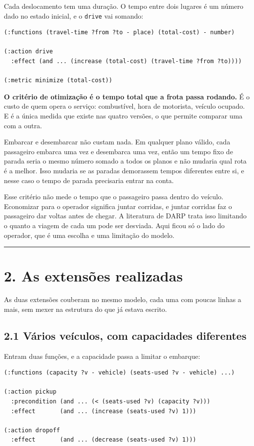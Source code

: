 \documentclass[11pt,a4paper]{article}
\newcommand{\cod}[1]{\texttt{#1}}
\newcommand{\separador}{\begin{center}\rule{0.45\linewidth}{0.4pt}\end{center}}
\begin{document}
Cada deslocamento tem uma duração. O tempo entre dois lugares é um número dado no estado inicial, e o \cod{drive} vai somando:

\begin{lstlisting}
(:functions (travel-time ?from ?to - place) (total-cost) - number)

(:action drive
  :effect (and ... (increase (total-cost) (travel-time ?from ?to))))

(:metric minimize (total-cost))
\end{lstlisting}

\textbf{O critério de otimização é o tempo total que a frota passa rodando.} É o custo de quem opera o serviço: combustível, hora de motorista, veículo ocupado. E é a única medida que existe nas quatro versões, o que permite comparar uma com a outra.

Embarcar e desembarcar não custam nada. Em qualquer plano válido, cada passageiro embarca uma vez e desembarca uma vez, então um tempo fixo de parada seria o mesmo número somado a todos os planos e não mudaria qual rota é a melhor. Isso mudaria se as paradas demorassem tempos diferentes entre si, e nesse caso o tempo de parada precisaria entrar na conta.

Esse critério não mede o tempo que o passageiro passa dentro do veículo. Economizar para o operador significa juntar corridas, e juntar corridas faz o passageiro dar voltas antes de chegar. A literatura de DARP trata isso limitando o quanto a viagem de cada um pode ser desviada. Aqui ficou só o lado do operador, que é uma escolha e uma limitação do modelo.

\separador

\section*{2. As extensões realizadas}

As duas extensões couberam no mesmo modelo, cada uma com poucas linhas a mais, sem mexer na estrutura do que já estava escrito.

\subsection*{2.1 Vários veículos, com capacidades diferentes}

Entram duas funções, e a capacidade passa a limitar o embarque:

\begin{lstlisting}
(:functions (capacity ?v - vehicle) (seats-used ?v - vehicle) ...)

(:action pickup
  :precondition (and ... (< (seats-used ?v) (capacity ?v)))
  :effect       (and ... (increase (seats-used ?v) 1)))

(:action dropoff
  :effect       (and ... (decrease (seats-used ?v) 1)))
\end{lstlisting}
\end{document}
